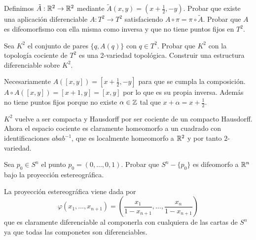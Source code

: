 \documentclass[twoside]{article}
\begin{document}
\begin{ejercicio}{8.5}
Definimos $\tilde{A}:\mathbb{R}^2\to\mathbb{R}^2$ mediante $\tilde{A}(x,y)=(x+\frac{1}{2}, -y)$. Probar que existe una aplicación diferenciable $A:T^2\to T^2$ satisfaciendo $A\circ\pi =\pi\circ \tilde{A}$. Probar que $A$ es difeomorfismo con ella misma como inversa y que no tiene puntos fijos en $T^2$. 

Sea $K^2$ el conjunto de pares $\{q,A(q)\}$ con $q\in T^2$. Probar que $K^2$ con la topología cociente de $T^2$ es una 2-variedad topológica. Construir una estructura diferenciable sobre $K^2$.
\end{ejercicio}
\begin{solucion}
Necesariamente $A([x,y])=[x+\frac{1}{2}, -y]$ para que se cumpla la composición. $A\circ A([x,y])=[x+1,y]=[x,y]$ por lo que es su propia inversa. Además no tiene puntos fijos porque no existe $\alpha\in\mathbb{Z}$ tal que $x+\alpha=x+\frac{1}{2}$.

$K^2$ vuelve a ser compacta y Hausdorff por ser cociente de un compacto Hausdorff. Ahora el espacio cociente es claramente homeomorfo a un cuadrado con identificaciones $abab^{-1}$, que es localmente homeomorfo a $\mathbb{R}^2$ y por tanto $2$-variedad.
\end{solucion}

\newpage

\begin{ejercicio}{8.6}
Sea $p_0\in S^n$  el punto $p_0=(0,\dots, 0,1)$. Probar que $S^n-\{p_0\}$ es difeomorfo a $\mathbb{R}^n$ bajo la proyección estereográfica. 
\end{ejercicio}
\begin{solucion}
\end{solucion}
La proyección estereográfica viene dada por
 \[
 φ (x_1,\dots,x_{n+1}) = \left(\frac{x_1}{1-x_{n+1}},\dots,\frac{x_n}{1-x_{n+1}}\right)
 \]
 que es claramente diferenciable al componerla con cualquiera de las cartas de $S^n$ ya que todas las componetes son diferenciables. 
\end{document}
